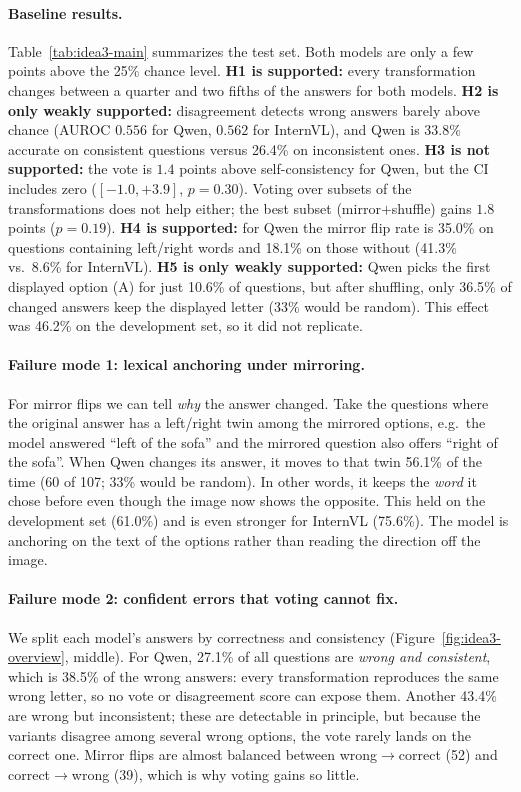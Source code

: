 \paragraph{Baseline results.}
Table~\ref{tab:idea3-main} summarizes the test set. Both models are only a few points above the
25\% chance level. \textbf{H1 is supported:} every transformation changes between a quarter and
two fifths of the answers for both models. \textbf{H2 is only weakly supported:} disagreement
detects wrong answers barely above chance (AUROC $0.556$ for Qwen, $0.562$ for InternVL), and
Qwen is 33.8\% accurate on consistent questions versus 26.4\% on inconsistent ones.
\textbf{H3 is not supported:} the vote is $1.4$ points above self-consistency for Qwen, but the
CI includes zero ($[-1.0,+3.9]$, $p=0.30$). Voting over subsets of the transformations does not
help either; the best subset (mirror$+$shuffle) gains $1.8$ points ($p=0.19$).
\textbf{H4 is supported:} for Qwen the mirror flip rate is 35.0\% on questions containing
left/right words and 18.1\% on those without (41.3\% vs.\ 8.6\% for InternVL).
\textbf{H5 is only weakly supported:} Qwen picks the first displayed option (A) for just 10.6\% of
questions, but after shuffling, only 36.5\% of changed answers keep the displayed letter (33\%
would be random). This effect was 46.2\% on the development set, so it did not replicate.

\paragraph{Failure mode 1: lexical anchoring under mirroring.}
For mirror flips we can tell \emph{why} the answer changed. Take the questions where the
original answer has a left/right twin among the mirrored options, e.g.\ the model answered
``left of the sofa'' and the mirrored question also offers ``right of the sofa''. When Qwen
changes its answer, it moves to that twin 56.1\% of the time (60 of 107; 33\% would be random).
In other words, it keeps the \emph{word} it chose before even though the image now shows the
opposite. This held on the development set (61.0\%) and is even stronger for InternVL (75.6\%).
The model is anchoring on the text of the options rather than reading the direction off the
image.

\paragraph{Failure mode 2: confident errors that voting cannot fix.}
We split each model's answers by correctness and consistency (Figure~\ref{fig:idea3-overview},
middle). For Qwen, 27.1\% of all questions are \emph{wrong and consistent}, which is 38.5\% of
the wrong answers: every transformation reproduces the same wrong letter, so no vote or
disagreement score can expose them. Another 43.4\% are wrong but inconsistent; these are
detectable in principle, but because the variants disagree among several wrong options, the
vote rarely lands on the correct one. Mirror flips are almost balanced between wrong$\to$correct
(52) and correct$\to$wrong (39), which is why voting gains so little.

